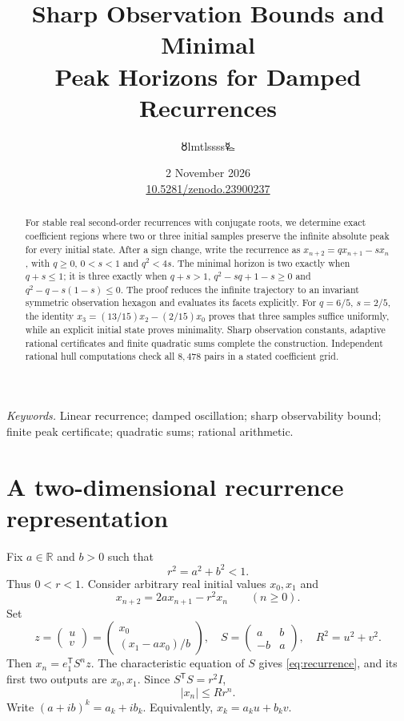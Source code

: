 \documentclass[11pt,a4paper]{article}
\title{\LARGE Sharp Observation Bounds and Minimal\\Peak Horizons for Damped Recurrences}
\author{{\authorsymbol 🜘}lmtlssss{\authorsymbol 🜐}}
\date{2 November 2026\\[3pt]\small\href{https://doi.org/10.5281/zenodo.23900237}{10.5281/zenodo.23900237}}
\newcommand{\R}{\mathbb R}\newcommand{\C}{\mathbb C}\newcommand{\Z}{\mathbb Z}\newcommand{\N}{\mathbb N}\newcommand{\ip}[2]{\langle #1,#2\rangle}\newcommand{\norm}[1]{\lVert #1\rVert}\newcommand{\one}{\mathbf 1}
\begin{document}
\maketitle\thispagestyle{plain}

\begin{abstract}
For stable real second-order recurrences with conjugate roots, we determine
exact coefficient regions where two or three initial samples preserve the
infinite absolute peak for every initial state. After a sign change, write
the recurrence as $x_{n+2}=q x_{n+1}-s x_n$, with $q\ge0$, $0<s<1$ and
$q^2<4s$. The minimal horizon is two exactly when $q+s\le1$; it is three
exactly when $q+s>1$, $q^2-sq+1-s\ge0$ and
$q^2-q-s(1-s)\le0$. The proof reduces the infinite trajectory to an
invariant symmetric observation hexagon and evaluates its facets explicitly.
For $q=6/5$, $s=2/5$, the identity
$x_3=(13/15)x_2-(2/15)x_0$ proves that three samples suffice uniformly,
while an explicit initial state proves minimality.
Sharp observation constants, adaptive rational certificates and finite
quadratic sums complete the construction. Independent rational hull
computations check all $8,478$ pairs in a stated coefficient grid.
\end{abstract}
\noindent\textit{Keywords.} Linear recurrence; damped oscillation; sharp
observability bound; finite peak certificate; quadratic sums; rational arithmetic.

\section{A two-dimensional recurrence representation}
Fix $a\in\R$ and $b>0$ such that
\begin{equation}\label{eq:stable}
 r^2=a^2+b^2<1.
\end{equation}
Thus $0<r<1$. Consider arbitrary real initial values $x_0,x_1$ and
\begin{equation}\label{eq:recurrence}
 x_{n+2}=2a x_{n+1}-r^2x_n\qquad(n\ge0).
\end{equation}
Set
\begin{equation}\label{eq:state}
 z=\begin{pmatrix}u\\v\end{pmatrix}
 =\begin{pmatrix}x_0\\(x_1-a x_0)/b\end{pmatrix},\quad
 S=\begin{pmatrix}a&b\\-b&a\end{pmatrix},\quad
 R^2=u^2+v^2.
\end{equation}
Then $x_n=e_1^\mathsf TS^n z$. The characteristic equation of $S$ gives
\eqref{eq:recurrence}, and its first two outputs are $x_0,x_1$.
Since $S^\mathsf TS=r^2I$,
\begin{equation}\label{eq:envelope}
 |x_n|\le Rr^n.
\end{equation}
Write $(a+ib)^k=a_k+ib_k$. Equivalently,
$x_k=a_ku+b_kv$.
\end{document}
